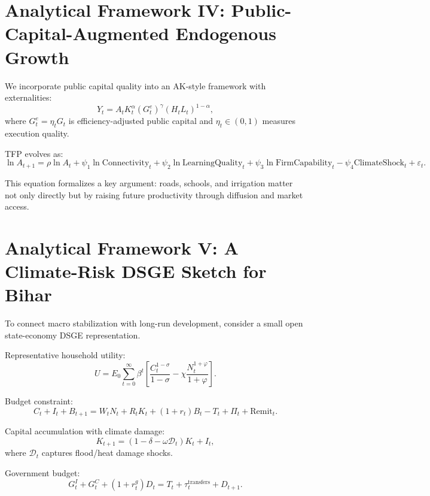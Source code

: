 \documentclass[preprint,12pt]{elsarticle}
\begin{document}
\section{Analytical Framework IV: Public-Capital-Augmented Endogenous Growth}
We incorporate public capital quality into an AK-style framework with externalities:
\begin{equation}
Y_t = A_t K_t^{\alpha}(G_t^e)^{\gamma}(H_t L_t)^{1-\alpha},
\end{equation}
where $G_t^e = \eta_t G_t$ is efficiency-adjusted public capital and $\eta_t \in (0,1)$ measures execution quality.

TFP evolves as:
\begin{equation}
\ln A_{t+1} = \rho \ln A_t + \psi_1 \ln \text{Connectivity}_t + \psi_2 \ln \text{LearningQuality}_t + \psi_3 \ln \text{FirmCapability}_t - \psi_4 \text{ClimateShock}_t + \varepsilon_t.
\end{equation}

This equation formalizes a key argument: roads, schools, and irrigation matter not only directly but by raising future productivity through diffusion and market access.

\section{Analytical Framework V: A Climate-Risk DSGE Sketch for Bihar}
To connect macro stabilization with long-run development, consider a small open state-economy DSGE representation.

Representative household utility:
\begin{equation}
U = E_0\sum_{t=0}^{\infty}\beta^t\left[\frac{C_t^{1-\sigma}}{1-\sigma} - \chi\frac{N_t^{1+\varphi}}{1+\varphi}\right].
\end{equation}

Budget constraint:
\begin{equation}
C_t + I_t + B_{t+1} = W_tN_t + R_tK_t + (1+r_t)B_t - T_t + \Pi_t + \text{Remit}_t.
\end{equation}

Capital accumulation with climate damage:
\begin{equation}
K_{t+1}=(1-\delta-\omega \mathcal{D}_t)K_t+I_t,
\end{equation}
where $\mathcal{D}_t$ captures flood/heat damage shocks.

Government budget:
\begin{equation}
G_t^I + G_t^C + (1+r_t^g)D_t = T_t + \tau_t^{\text{transfers}} + D_{t+1}.
\end{equation}
\end{document}
